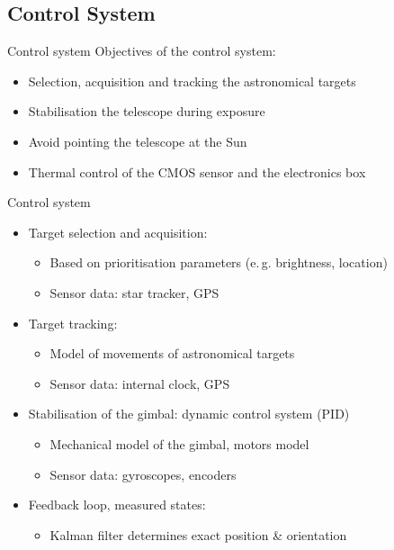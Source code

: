 \documentclass[11pt, aspectratio=169]{beamer}
\begin{document}
\subsection{Control System}

\begin{frame}{Control system}
    Objectives of the control system:
    \begin{itemize}
        \item Selection, acquisition and tracking the astronomical targets
        \item Stabilisation the telescope during exposure
        \item Avoid pointing the telescope at the Sun
        \item Thermal control of the CMOS sensor and the electronics box
    \end{itemize}
\end{frame}

\begin{frame}{Control system}
    \begin{itemize}
        \item<1-> Target selection and acquisition: %
        \begin{itemize}
            \item Based on prioritisation parameters (e.\,g. brightness, location)
            \item Sensor data: star tracker, GPS %
        \end{itemize}
        \item<2-> Target tracking: 
        \begin{itemize}
            \item Model of movements of astronomical targets
            \item Sensor data: internal clock, GPS
        \end{itemize}
        \item<3-> Stabilisation of the gimbal: dynamic control system (PID) %
        \begin{itemize}
            \item Mechanical model of the gimbal, motors model
            \item Sensor data: gyroscopes, encoders%
        \end{itemize}
        \item<4-> Feedback loop, measured states: 
        \begin{itemize}
            \item Kalman filter determines exact position \& orientation
        \end{itemize}
    \end{itemize}
\end{frame}
\end{document}
